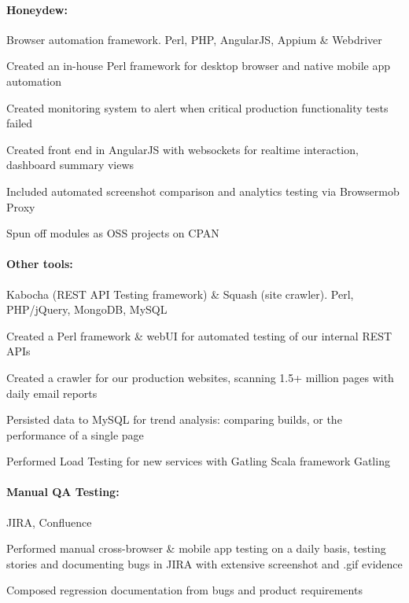 \begin{position}

  \paragraph{Honeydew:} Browser automation framework. Perl, PHP, AngularJS, Appium \& Webdriver
  \begin{myitem}
  \item Created an in-house Perl framework for desktop browser and native mobile app automation
  \item Created monitoring system to alert when critical production functionality tests failed
  \item Created front end in AngularJS with websockets for realtime interaction, dashboard summary views
  \item Included automated screenshot comparison and analytics testing via Browsermob Proxy
  \item Spun off modules as OSS projects on CPAN
  \end{myitem}
  \paragraph{Other tools:} Kabocha (REST API Testing framework) \& Squash (site crawler). Perl, PHP/jQuery, MongoDB, MySQL
  \begin{myitem}
  \item Created a Perl framework \& webUI for automated testing of our internal REST APIs
  \item Created a crawler for our production websites, scanning 1.5+ million pages with daily email reports
  \item Persisted data to MySQL for trend analysis: comparing builds, or the performance of a single page
  \item Performed Load Testing for new services with Gatling Scala framework Gatling
  \end{myitem}
  \paragraph{Manual QA Testing:} JIRA, Confluence
  \begin{myitem}
  \item Performed manual cross-browser \& mobile app testing on a daily basis, testing stories and documenting bugs in JIRA with extensive screenshot and .gif evidence
  \item Composed regression documentation from bugs and product requirements
  \end{myitem}
\end{position}
%
